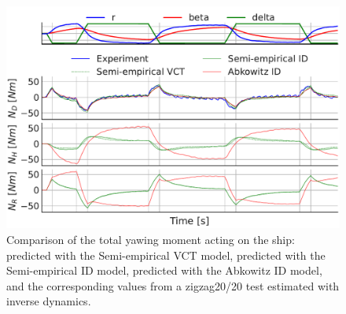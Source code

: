 \begin{figure}[h!]
    \includegraphics[width=\columnwidth]{figures/result_ID_regression.ID_regression_ID_N.pdf}
    \caption{Comparison of the total yawing moment acting on the ship: predicted with the Semi-empirical VCT model, predicted with the Semi-empirical ID model, predicted with the Abkowitz ID model, and the corresponding values from a zigzag20/20 test estimated with inverse dynamics.}
    \label{fig:ID_regression_ID_N}
\end{figure}

